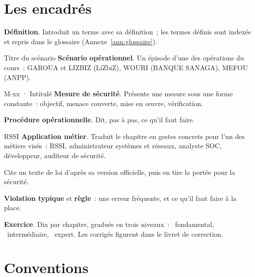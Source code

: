 \section*{Les encadrés}

\begin{boxdef}
\textbf{Définition}. Introduit un terme avec sa définition~; les termes
définis sont indexés et repris dans le glossaire (Annexe~\ref{ann:glossaire}).
\end{boxdef}

\begin{boxscenario}{Titre du scénario}
\textbf{Scénario opérationnel}. Un épisode d'une des opérations du
cours~: GAROUA et LIZBIZ (LiZbiZ), WOURI (BANQUE SANAGA), MEFOU (ANPP).
\end{boxscenario}

\begin{boxobjet}{M-xx · Intitulé}
\textbf{Mesure de sécurité}. Présente une mesure sous une forme
constante~: objectif, menace couverte, mise en œuvre, vérification.
\end{boxobjet}

\begin{boxprocedure}
\textbf{Procédure opérationnelle}. Dit, pas à pas, ce qu'il faut faire.
\end{boxprocedure}

\begin{boxmetier}{RSSI}
\textbf{Application métier}. Traduit le chapitre en gestes concrets pour
l'un des métiers visés~: RSSI, administrateur systèmes et réseaux, analyste
SOC, développeur, auditeur de sécurité.
\end{boxmetier}

\begin{boxjuris}
Cite un texte de loi d'après sa version officielle, puis en tire la
portée pour la sécurité.
\end{boxjuris}

\begin{boxalert}
\textbf{Violation typique} et \textbf{règle}~: une erreur fréquente, et ce
qu'il faut faire à la place.
\end{boxalert}

\begin{boxexo}
\textbf{Exercice}. Dix par chapitre, gradués en trois niveaux~:
\niveaubase\ fondamental, \niveaumoyen\ intermédiaire, \niveauexpert\
expert. Les corrigés figurent dans le livret de correction.
\end{boxexo}

\section*{Conventions}


